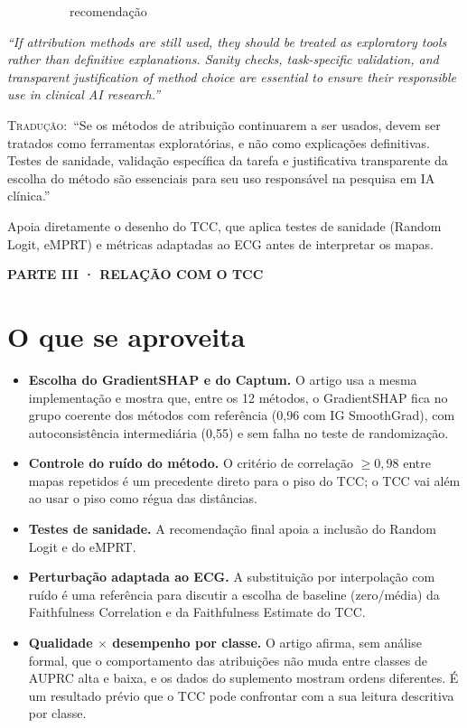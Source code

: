 \documentclass[11pt,a4paper]{article}
\newcommand{\pagechip}[1]{{\setlength{\fboxsep}{1.5pt}\colorbox{cAcc}{\textcolor{white}{\scriptsize\texttt{#1}}}}}
\newcommand{\partbar}[1]{\par\vspace{1.2em}\noindent\colorbox{black!80}{\parbox{\dimexpr\linewidth-2\fboxsep}{\color{white}\bfseries\sffamily\MakeUppercase{#1}}}\par\vspace{0.4em}}
\newenvironment{origquote}{\par\itshape\small}{\par}
\newenvironment{tradquote}{\par\small\textsc{Tradução:}\ }{\par}
\newcommand{\explab}[1]{\par\smallskip{\small\color{cAcc}\textbf{\MakeUppercase{#1}}}\par}
\begin{document}
\begin{citacard}{\pagechip{Conclusão} recomendação}
\begin{origquote}“If attribution methods are still used, they should be treated as exploratory tools rather than definitive explanations. Sanity checks, task-specific validation, and transparent justification of method choice are essential to ensure their responsible use in clinical AI research.”\end{origquote}
\begin{tradquote}“Se os métodos de atribuição continuarem a ser usados, devem ser tratados como ferramentas exploratórias, e não como explicações definitivas. Testes de sanidade, validação específica da tarefa e justificativa transparente da escolha do método são essenciais para seu uso responsável na pesquisa em IA clínica.”\end{tradquote}
\explab{Explicação}
Apoia diretamente o desenho do TCC, que aplica testes de sanidade (Random Logit, eMPRT) e métricas adaptadas ao ECG antes de interpretar os mapas.
\end{citacard}

\partbar{Parte III · Relação com o TCC}

\section{O que se aproveita}
\begin{itemize}
\item \textbf{Escolha do GradientSHAP e do Captum.} O artigo usa a mesma implementação e mostra que, entre os 12 métodos, o GradientSHAP fica no grupo coerente dos métodos com referência (0,96 com IG SmoothGrad), com autoconsistência intermediária (0,55) e sem falha no teste de randomização.
\item \textbf{Controle do ruído do método.} O critério de correlação $\geq 0{,}98$ entre mapas repetidos é um precedente direto para o piso do TCC; o TCC vai além ao usar o piso como régua das distâncias.
\item \textbf{Testes de sanidade.} A recomendação final apoia a inclusão do Random Logit e do eMPRT.
\item \textbf{Perturbação adaptada ao ECG.} A substituição por interpolação com ruído é uma referência para discutir a escolha de baseline (zero/média) da Faithfulness Correlation e da Faithfulness Estimate do TCC.
\item \textbf{Qualidade $\times$ desempenho por classe.} O artigo afirma, sem análise formal, que o comportamento das atribuições não muda entre classes de AUPRC alta e baixa, e os dados do suplemento mostram ordens diferentes. É um resultado prévio que o TCC pode confrontar com a sua leitura descritiva por classe.
\end{itemize}
\end{document}
